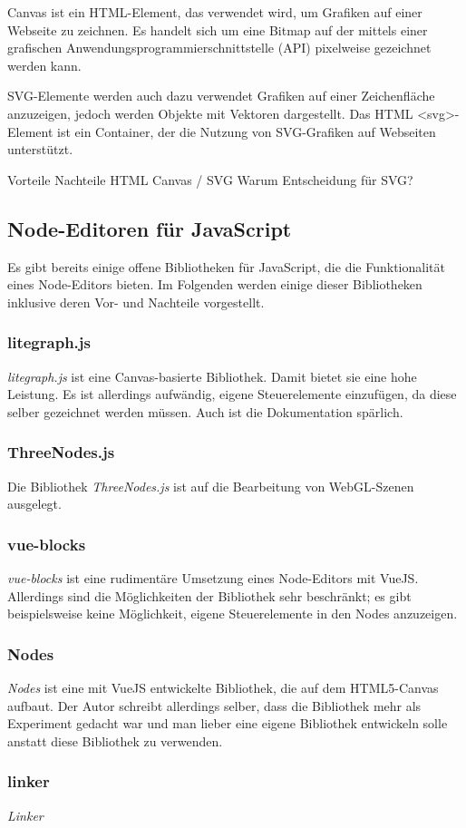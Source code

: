 Canvas ist ein HTML-Element, das verwendet wird, um Grafiken auf einer Webseite zu zeichnen. Es handelt sich um eine Bitmap auf der mittels einer grafischen Anwendungsprogrammierschnittstelle (API) pixelweise gezeichnet werden kann.

SVG-Elemente werden auch dazu verwendet Grafiken auf einer Zeichenfläche anzuzeigen, jedoch werden Objekte mit Vektoren dargestellt. Das HTML <svg>-Element ist ein Container, der die Nutzung von SVG-Grafiken auf Webseiten unterstützt.

Vorteile Nachteile HTML Canvas / SVG
Warum Entscheidung für SVG?

\subsection{Node-Editoren für JavaScript}

Es gibt bereits einige offene Bibliotheken für JavaScript, die die Funktionalität eines Node-Editors bieten. Im Folgenden werden einige dieser Bibliotheken inklusive deren Vor- und Nachteile vorgestellt.

\subsubsection*{litegraph.js}
\textit{litegraph.js} ist eine Canvas-basierte Bibliothek. Damit bietet sie eine hohe Leistung. Es ist allerdings aufwändig, eigene Steuerelemente einzufügen, da diese selber gezeichnet werden müssen. Auch ist die Dokumentation spärlich.

\subsubsection*{ThreeNodes.js}
Die Bibliothek \textit{ThreeNodes.js} ist auf die Bearbeitung von WebGL-Szenen ausgelegt.

\subsubsection*{vue-blocks}
\textit{vue-blocks} ist eine rudimentäre Umsetzung eines Node-Editors mit VueJS. Allerdings sind die Möglichkeiten der Bibliothek sehr beschränkt; es gibt beispielsweise keine Möglichkeit, eigene Steuerelemente in den Nodes anzuzeigen.

\subsubsection*{Nodes}
\textit{Nodes} ist eine mit VueJS entwickelte Bibliothek, die auf dem HTML5-Canvas aufbaut. Der Autor schreibt allerdings selber, dass die Bibliothek mehr als Experiment gedacht war und man lieber eine eigene Bibliothek entwickeln solle anstatt diese Bibliothek zu verwenden.

\subsubsection*{linker}
\textit{Linker} 